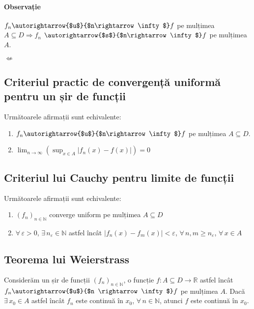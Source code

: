 \paragraph{Observație}
$f_{n} \autorightarrow{$u$}{$n\rightarrow\infty$} f$ pe mulțimea $A
\subseteq D \Rightarrow f_n$ $\autorightarrow{$s$}{$n\rightarrow\infty$} f$
pe mulțimea $A$.

\hspace{187pt}
$\nLeftarrow$

\subsection{Criteriul practic de convergență uniformă pentru un șir de
funcții}
Următoarele afirmații sunt echivalente:
\begin{enumerate}[label=\emph{\alph*})]
    \item $f_{n} \autorightarrow{$u$}{$n\rightarrow\infty$} f$ pe mulțimea
	    $A \subseteq D$.
    \item $\displaystyle\lim_{n \rightarrow \infty}(\sup_{x \in A} \lvert
	    f_{n}(x) - f(x) \rvert) = 0$
\end{enumerate}

\subsection{Criteriul lui Cauchy pentru limite de funcții}
Următoarele afirmații sunt echivalente:
\begin{enumerate}[label=\emph{\alph*})]
	\item $(f_{n})_{n \in \mathbb{N}}$ converge uniform pe mulțimea
		$A \subseteq D$
	\item $\forall \, \varepsilon>0$, $\exists \, n_{\varepsilon} \in
		\mathbb{N}$ astfel încât $\vert f_{n}(x) - f_{m}(x) \rvert <
		\varepsilon$, $\forall \, n, m \geq n_{\varepsilon}$,
		$\forall \, x \in A$
\end{enumerate}

\subsection{Teorema lui Weierstrass}
Considerăm un șir de funcții $(f_{n})_{n \in \mathbb{N}}$, o funcție $f:A
\subseteq D \rightarrow \mathbb{R}$ astfel încât $f_{n}
\autorightarrow{$u$}{$n \rightarrow \infty$} f$ pe mulțimea $A$. Dacă
$\exists \, x_{0} \in A$ astfel încât $f_{n}$ este continuă în $x_{0}$,
$\forall \, n \in \mathbb{N}$, atunci $f$ este continuă în $x_{0}$.

